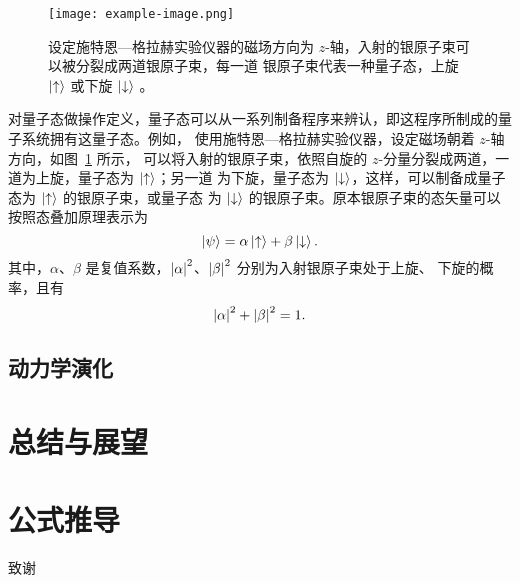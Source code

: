 \documentclass[type=doctor]{fduthesis}
\begin{document}
\begin{figure}[htb]
  \centering
  \texttt{[image: example-image.png]}
  \caption[施特恩—格拉赫实验]{%
    设定施特恩—格拉赫实验仪器的磁场方向为 $z$-轴，入射的银原子束可以被分裂成两道银原子束，每一道
    银原子束代表一种量子态，上旋 $\ket{\uparrow}$ 或下旋 $\ket{\downarrow}$%
    \cite{wikimedia:stern-gerlach-experiment}。}
  \label{fig:stern-gerlach-experiment}
\end{figure}

对量子态做操作定义，量子态可以从一系列制备程序来辨认，即这程序所制成的量子系统拥有这量子态。例如，
使用施特恩—格拉赫实验仪器，设定磁场朝着 $z$-轴方向，如图~\ref{fig:stern-gerlach-experiment} 所示，
可以将入射的银原子束，依照自旋的 $z$-分量分裂成两道，一道为上旋，量子态为 $\ket{\uparrow}$；另一道
为下旋，量子态为 $\ket{\downarrow}$，这样，可以制备成量子态为 $\ket{\uparrow}$ 的银原子束，或量子态
为 $\ket{\downarrow}$ 的银原子束。原本银原子束的态矢量可以按照态叠加原理表示为
\begin{equation}
  \ket{\psi} = \alpha \ket{\uparrow} + \beta \ket{\downarrow}.
\end{equation}
其中，$\alpha$、$\beta$ 是复值系数，$\abs{\alpha}^2$、$\abs{\beta}^2$ 分别为入射银原子束处于上旋、
下旋的概率，且有
\begin{equation}
  \abs{\alpha}^2 + \abs{\beta}^2 = 1.
\end{equation}

\section{动力学演化}

\chapter{总结与展望}

\appendix

\chapter{公式推导}

\backmatter

\printbibliography

\begin{acknowledgements}
  致谢
\end{acknowledgements}
\end{document}
